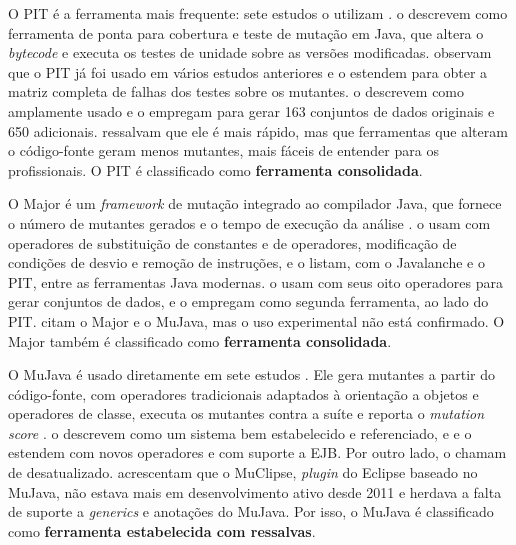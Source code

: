 O PIT é a ferramenta mais frequente: sete estudos o utilizam \cite{assylbekov2013, inozemtseva2013, ahmed2016, zhang2019, guizzo2022, zhang2022, ojdanic2023}.  o descrevem como ferramenta de ponta para cobertura e teste de mutação em Java, que altera o \textit{bytecode} e executa os testes de unidade sobre as versões modificadas.  observam que o PIT já foi usado em vários estudos anteriores e o estendem para obter a matriz completa de falhas dos testes sobre os mutantes.  o descrevem como amplamente usado e o empregam para gerar 163 conjuntos de dados originais e 650 adicionais.  ressalvam que ele é mais rápido, mas que ferramentas que alteram o código-fonte geram menos mutantes, mais fáceis de entender para os profissionais. O PIT é classificado como \textbf{ferramenta consolidada}.

O Major é um \textit{framework} de mutação integrado ao compilador Java, que fornece o número de mutantes gerados e o tempo de execução da análise \cite{just2012}.  o usam com operadores de substituição de constantes e de operadores, modificação de condições de desvio e remoção de instruções, e o listam, com o Javalanche e o PIT, entre as ferramentas Java modernas.  o usam com seus oito operadores para gerar conjuntos de dados, e  o empregam como segunda ferramenta, ao lado do PIT.  citam o Major e o MuJava, mas o uso experimental não está confirmado. O Major também é classificado como \textbf{ferramenta consolidada}.

O MuJava é usado diretamente em sete estudos \cite{kintis2010, nica2011, chauhan2015, shomali2020, arasteh2022, arasteh2023, tao2025}. Ele gera mutantes a partir do código-fonte, com operadores tradicionais adaptados à orientação a objetos e operadores de classe, executa os mutantes contra a suíte e reporta o \textit{mutation score} \cite{chauhan2015}.  o descrevem como um sistema bem estabelecido e referenciado, e  e  o estendem com novos operadores e com suporte a EJB. Por outro lado,  o chamam de desatualizado.  acrescentam que o MuClipse, \textit{plugin} do Eclipse baseado no MuJava, não estava mais em desenvolvimento ativo desde 2011 e herdava a falta de suporte a \textit{generics} e anotações do MuJava. Por isso, o MuJava é classificado como \textbf{ferramenta estabelecida com ressalvas}.

